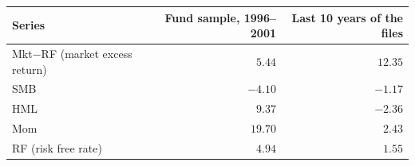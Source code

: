 \begin{tabular}{lrr}
\toprule
Series & Fund sample, 1996--2001 & Last 10 years of the files \\
\midrule
Mkt$-$RF (market excess return) & $5.44$ & $12.35$ \\
SMB & $-4.10$ & $-1.17$ \\
HML & $9.37$ & $-2.36$ \\
Mom & $19.70$ & $2.43$ \\
RF (risk free rate) & $4.94$ & $1.55$ \\
\bottomrule
\end{tabular}
